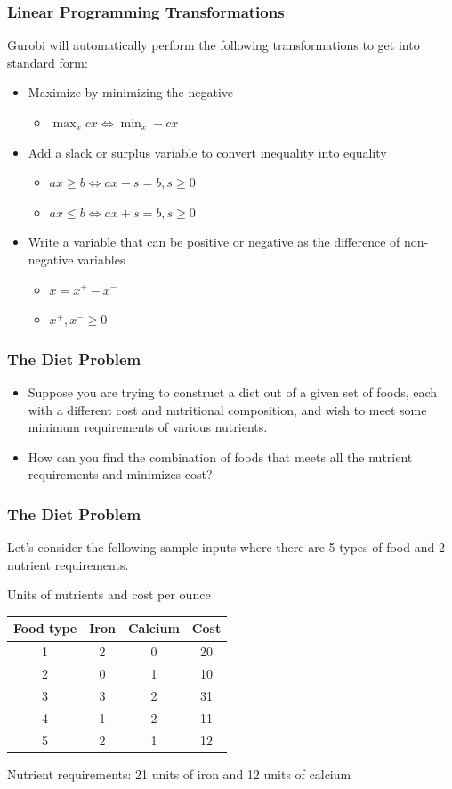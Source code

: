 \documentclass[12pt,handout]{beamer}
\begin{document}
\begin{frame}
\frametitle{Linear Programming Transformations}
Gurobi will automatically perform the following transformations to get into standard form:
\begin{itemize}
\item Maximize by minimizing the negative
    \begin{itemize}
    \item $\max_x cx \Leftrightarrow \min_x -cx$
    \end{itemize}
\item Add a slack or surplus variable to convert inequality into equality
    \begin{itemize}
    \item $ax \ge b \Leftrightarrow ax - s = b, s \ge 0$
    \item $ax \le b \Leftrightarrow ax + s = b, s \ge 0$    
    \end{itemize}
\item Write a variable that can be positive or negative as the difference of non-negative variables
    \begin{itemize}
    \item $x = x^+ - x^-$
    \item $x^+, x^- \ge 0$
    \end{itemize}
\end{itemize}
\end{frame}

\begin{frame}
\frametitle{The Diet Problem}
\begin{itemize}
\item Suppose you are trying to construct a diet out of a given set of foods, each with a different cost and nutritional composition, and wish to meet some minimum requirements of various nutrients.
\item How can you find the combination of foods that meets all the nutrient requirements and minimizes cost?
\end{itemize}
\end{frame}

\begin{frame}
\frametitle{The Diet Problem}
Let's consider the following sample inputs where there are 5 types of food and 2 nutrient requirements.
\begin{center}
Units of nutrients and cost per ounce
\begin{tabular} {c | c | c | c}
Food type & Iron & Calcium & Cost \\
\hline
1 & 2 & 0 & 20 \\
2 & 0 & 1 & 10 \\
3 & 3 & 2 & 31 \\
4 & 1 & 2 & 11 \\
5 & 2 & 1 & 12 \\
\end{tabular}
\end{center}
Nutrient requirements: 21 units of iron and 12 units of calcium
\end{frame}
\end{document}
